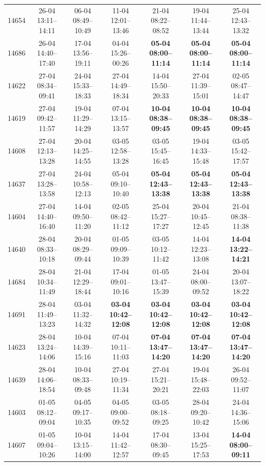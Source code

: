 \begin{table}[htbp]
\begin{tabular}{|r|c|c|c|c|c|c|}
14654 & 26-04 13:11--14:11 & 06-04 08:49--10:49 & 11-04 12:01--13:46 & 21-04 08:22--08:52 & 19-04 11:44--13:44 & 25-04 12:43--13:32 \\ 
14686 & 26-04 14:40--17:40 & 17-04 13:56--19:11 & 04-04 15:26--00:26 & \textbf{05-04 08:00--11:14} & \textbf{05-04 08:00--11:14} & \textbf{05-04 08:00--11:14} \\ 
14622 & 27-04 08:34--09:41 & 24-04 15:33--18:33 & 27-04 14:49--18:34 & 14-04 15:50--20:33 & 27-04 11:39--15:01 & 02-05 08:47--14:47 \\ 
14619 & 27-04 09:42--11:57 & 19-04 11:29--14:29 & 07-04 13:15--13:57 & \textbf{10-04 08:38--09:45} & \textbf{10-04 08:38--09:45} & \textbf{10-04 08:38--09:45} \\ 
14608 & 27-04 12:13--13:28 & 20-04 14:25--14:55 & 03-05 12:58--13:28 & 03-05 15:45--16:45 & 19-04 14:33--15:48 & 03-05 15:42--17:57 \\ 
14637 & 27-04 13:28--13:58 & 24-04 10:58--12:13 & 05-04 09:10--10:40 & \textbf{05-04 12:43--13:38} & \textbf{05-04 12:43--13:38} & \textbf{05-04 12:43--13:38} \\ 
14604 & 27-04 14:40--16:40 & 14-04 09:50--11:20 & 02-05 08:42--11:12 & 25-04 15:27--17:27 & 20-04 10:45--12:45 & 21-04 08:38--11:38 \\ 
14640 & 28-04 08:33--10:18 & 20-04 08:29--09:44 & 01-05 09:09--10:39 & 03-05 10:12--11:42 & 14-04 12:23--13:08 & \textbf{14-04 13:22--14:21} \\ 
14684 & 28-04 10:34--11:49 & 21-04 12:29--18:44 & 17-04 09:01--10:16 & 01-05 13:47--15:39 & 24-04 08:00--09:52 & 20-04 13:07--18:22 \\ 
14691 & 28-04 11:49--13:23 & 03-04 11:32--14:32 & \textbf{03-04 10:42--12:08} & \textbf{03-04 10:42--12:08} & \textbf{03-04 10:42--12:08} & \textbf{03-04 10:42--12:08} \\ 
14623 & 28-04 13:24--14:06 & 10-04 14:39--15:16 & 07-04 10:11--11:03 & \textbf{07-04 13:47--14:20} & \textbf{07-04 13:47--14:20} & \textbf{07-04 13:47--14:20} \\ 
14639 & 28-04 14:06--18:54 & 10-04 08:33--09:48 & 27-04 10:19--11:34 & 27-04 15:21--20:21 & 19-04 15:48--22:03 & 26-04 09:52--11:07 \\ 
14603 & 01-05 08:12--09:04 & 04-05 09:17--10:35 & 04-05 09:00--09:52 & 03-05 08:18--09:25 & 28-04 09:20--10:42 & 24-04 14:36--15:06 \\ 
14607 & 01-05 09:04--10:26 & 10-04 13:15--14:00 & 14-04 11:42--12:57 & 17-04 08:30--09:45 & 13-04 15:25--17:53 & \textbf{14-04 08:00--09:11} \\ 

\end{tabular}
\end{table}

